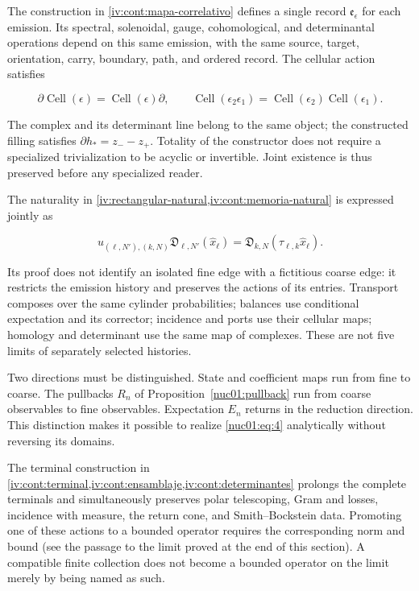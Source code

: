 The construction in \cref{iv:cont:mapa-correlativo} defines a single record \(\mathfrak e_\epsilon\) for each emission. Its spectral, solenoidal, gauge, cohomological, and determinantal operations depend on this same emission, with the same source, target, orientation, carry, boundary, path, and ordered record. The cellular action satisfies

\[
\partial\operatorname{Cell}(\epsilon)=\operatorname{Cell}(\epsilon)\partial,
\qquad
\operatorname{Cell}(\epsilon_2\epsilon_1)
=\operatorname{Cell}(\epsilon_2)\operatorname{Cell}(\epsilon_1).
\]

The complex and its determinant line belong to the same object; the constructed filling satisfies \(\partial h_*=z_--z_+\). Totality of the constructor does not require a specialized trivialization to be acyclic or invertible. Joint existence is thus preserved before any specialized reader.

The naturality in \cref{iv:rectangular-natural,iv:cont:memoria-natural} is expressed jointly as

\begin{equation}
u_{(\ell,N'),(k,N)}\mathfrak D_{\ell,N'}(\widehat x_\ell)
=\mathfrak D_{k,N}(\tau_{\ell,k}\widehat x_\ell).
\label{nuc01:eq:4}
\end{equation}

Its proof does not identify an isolated fine edge with a fictitious coarse edge: it restricts the emission history and preserves the actions of its entries. Transport composes over the same cylinder probabilities; balances use conditional expectation and its corrector; incidence and ports use their cellular maps; homology and determinant use the same map of complexes. These are not five limits of separately selected histories.

Two directions must be distinguished. State and coefficient maps run from fine to coarse. The pullbacks \(R_n\) of Proposition~\ref{nuc01:pullback} run from coarse observables to fine observables. Expectation \(E_n\) returns in the reduction direction. This distinction makes it possible to realize \eqref{nuc01:eq:4} analytically without reversing its domains.

The terminal construction in \cref{iv:cont:terminal,iv:cont:ensamblaje,iv:cont:determinantes} prolongs the complete terminals and simultaneously preserves polar telescoping, Gram and losses, incidence with measure, the return cone, and Smith–Bockstein data. Promoting one of these actions to a bounded operator requires the corresponding norm and bound (see the passage to the limit proved at the end of this section). A compatible finite collection does not become a bounded operator on the limit merely by being named as such.

